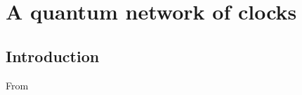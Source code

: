 \chapter{A quantum network of clocks}
\label{ch:Komar2014}

\section{Introduction}
From \cite{Komar2014}